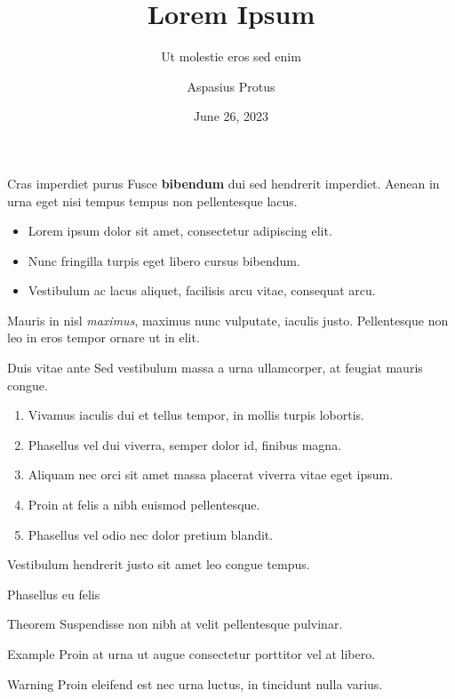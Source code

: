 \title{Lorem Ipsum}
\subtitle{Ut molestie eros sed enim}
\author{Aspasius Protus}
\date{June 26, 2023} 

\frame{\maketitle} 

\begin{frame}{Cras imperdiet purus}
  Fusce \textbf{bibendum} dui sed hendrerit imperdiet.
  Aenean in urna eget nisi tempus tempus non pellentesque lacus.
  \begin{itemize}
    \item Lorem ipsum dolor sit amet, consectetur adipiscing elit.
    \item Nunc fringilla turpis eget libero cursus bibendum.
    \item Vestibulum ac lacus aliquet, facilisis arcu vitae, consequat arcu.
  \end{itemize}
  Mauris in nisl \textit{maximus}, maximus nunc vulputate, iaculis justo.
  Pellentesque non leo in eros tempor ornare ut in elit.
\end{frame}

\begin{frame}{Duis vitae ante}
  Sed vestibulum massa a urna ullamcorper, at feugiat mauris congue.
  \begin{enumerate}
    \item Vivamus iaculis dui et tellus tempor, in mollis turpis lobortis.
    \item Phasellus vel dui viverra, semper dolor id, finibus magna.
    \item Aliquam nec orci sit amet massa placerat viverra vitae eget ipsum.
    \item Proin at felis a nibh euismod pellentesque.
    \item Phasellus vel odio nec dolor pretium blandit.
  \end{enumerate}
  Vestibulum hendrerit justo sit amet leo congue tempus.
\end{frame}

\begin{frame}{Phasellus eu felis}
  
  \begin{block}{Theorem}
    Suspendisse non nibh at velit pellentesque pulvinar.
  \end{block}

  \begin{exampleblock}{Example}
    Proin at urna ut augue consectetur porttitor vel at libero.
  \end{exampleblock}

  \begin{alertblock}{Warning}
    Proin eleifend est nec urna luctus, in tincidunt nulla varius.
  \end{alertblock}
\end{frame}

